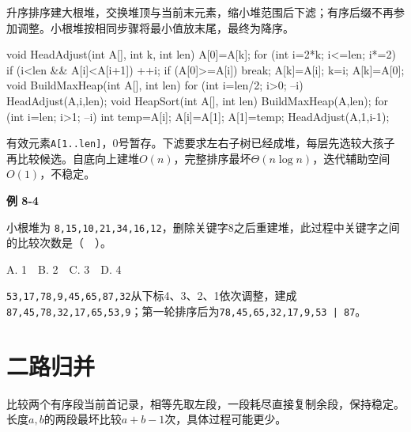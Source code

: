 升序排序建大根堆，交换堆顶与当前末元素，缩小堆范围后下滤；有序后缀不再参加调整。小根堆按相同步骤将最小值放末尾，最终为降序。

\par\smallskip\noindent\begin{minipage}{\linewidth}
\begin{codeblock}[language={C++}]
void HeadAdjust(int A[], int k, int len) {
    A[0]=A[k];
    for (int i=2*k; i<=len; i*=2) {
        if (i<len && A[i]<A[i+1]) ++i;
        if (A[0]>=A[i]) break;
        A[k]=A[i];
        k=i;
    }
    A[k]=A[0];
}
void BuildMaxHeap(int A[], int len) {
    for (int i=len/2; i>0; --i) HeadAdjust(A,i,len);
}
void HeapSort(int A[], int len) {
    BuildMaxHeap(A,len);
    for (int i=len; i>1; --i) {
        int temp=A[i]; A[i]=A[1]; A[1]=temp;
        HeadAdjust(A,1,i-1);
    }
}
\end{codeblock}
\end{minipage}\par\smallskip

有效元素\texttt{A[\allowbreak{}1.\allowbreak{}.\allowbreak{}len]\allowbreak{}}，0号暂存。下滤要求左右子树已经成堆，每层先选较大孩子再比较候选。自底向上建堆\(O(n)\)，完整排序最坏\(\Theta(n\log n)\)，迭代辅助空间\(O(1)\)，不稳定。

\par\medskip{}\noindent\hypertarget{DS08-E03}{}\label{DS08-E03}\textbf{例 8-4}\par\nobreak\smallskip

小根堆为 \texttt{8,\allowbreak{}15,\allowbreak{}10,\allowbreak{}21,\allowbreak{}34,\allowbreak{}16,\allowbreak{}12}，删除关键字8之后重建堆，此过程中关键字之间的比较次数是（　）。

A. 1　B. 2　C. 3　D. 4

\texttt{53,\allowbreak{}17,\allowbreak{}78,\allowbreak{}9,\allowbreak{}45,\allowbreak{}65,\allowbreak{}87,\allowbreak{}32}从下标4、3、2、1依次调整，建成\texttt{87,\allowbreak{}45,\allowbreak{}78,\allowbreak{}32,\allowbreak{}17,\allowbreak{}65,\allowbreak{}53,\allowbreak{}9}；第一轮排序后为\texttt{78,\allowbreak{}45,\allowbreak{}65,\allowbreak{}32,\allowbreak{}17,\allowbreak{}9,\allowbreak{}53 | 87}。

\section{二路归并}\label{DS08-merge}

比较两个有序段当前首记录，相等先取左段，一段耗尽直接复制余段，保持稳定。长度\(a,b\)的两段最坏比较\(a+b-1\)次，具体过程可能更少。

